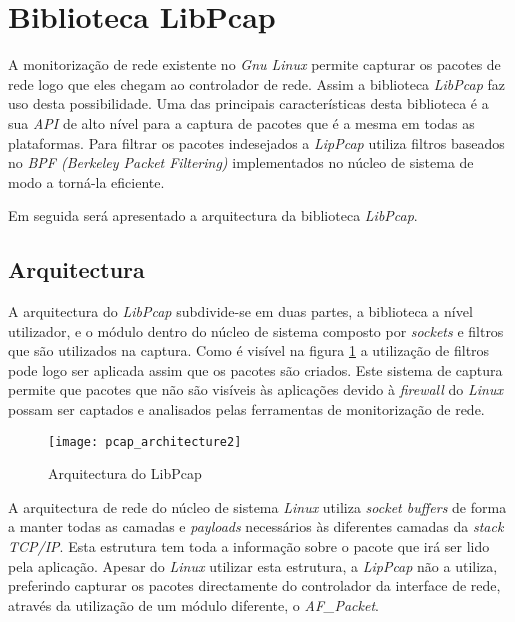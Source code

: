 \section{Biblioteca LibPcap}\label{sect:LibPcap}

A monitorização de rede existente no \textit{Gnu Linux} permite capturar os pacotes de rede logo que eles chegam ao controlador de rede. Assim a biblioteca \textit{LibPcap}\cite{:LibPcap} faz uso desta possibilidade. Uma das principais características desta biblioteca é a sua \textit{API} de alto nível para a captura de pacotes que é a mesma em todas as plataformas. Para filtrar os pacotes indesejados a \textit{LipPcap} utiliza filtros baseados no \textit{BPF (Berkeley Packet Filtering)} implementados no núcleo de sistema de modo a torná-la eficiente.

Em seguida será apresentado a arquitectura da biblioteca \textit{LibPcap}.

\subsection {Arquitectura}\label{sect:architecture_libpcap}
A arquitectura do \textit{LibPcap} subdivide-se em duas partes, a biblioteca a nível utilizador, e o módulo dentro do núcleo de sistema composto por \textit{sockets} e filtros que são utilizados na captura. Como é visível na figura \ref{fig:pcap_architecture} a utilização de filtros pode logo ser aplicada assim que os pacotes são criados. Este sistema de captura permite que pacotes que não são visíveis às aplicações devido à \textit{firewall} do \textit{Linux} possam ser captados e analisados pelas ferramentas de monitorização de rede.

\begin{figure}[h]
       \centering
       \texttt{[image: pcap\_architecture2]}
       \caption{Arquitectura do LibPcap}
      \label{fig:pcap_architecture}
\end{figure}

A arquitectura de rede do núcleo de sistema \textit{Linux} utiliza \textit{socket buffers} de forma a manter todas as camadas e \textit{payloads} necessários às diferentes camadas da \textit{stack TCP/IP}. Esta estrutura tem toda a informação sobre o pacote que irá ser lido pela aplicação. Apesar do \textit{Linux} utilizar esta estrutura, a \textit{LipPcap} não a utiliza, preferindo capturar os pacotes directamente do controlador da interface de rede, através da utilização de um módulo diferente, o \textit{AF\_Packet}.

